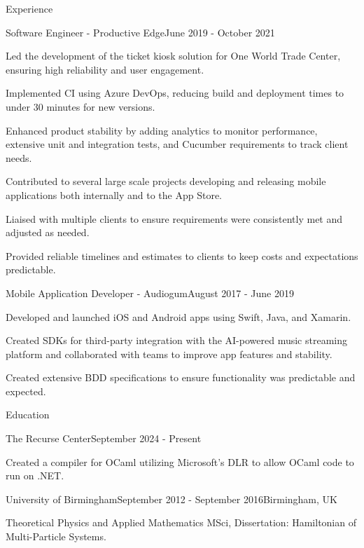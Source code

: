 \documentclass[
	10pt, %
]{resume} %
\begin{document}
\begin{rSection}{Experience}
	\begin{rSubsection}{Software Engineer - Productive Edge}{June 2019 - October 2021}{}{}
		\item Led the development of the ticket kiosk solution for One World Trade Center, ensuring high reliability and user engagement.
		\item Implemented CI using Azure DevOps, reducing build and deployment times to under 30 minutes for new versions.
		\item Enhanced product stability by adding analytics to monitor performance, extensive unit and integration tests, and Cucumber requirements to track client needs.
		\item Contributed to several large scale projects developing and releasing mobile applications both internally and to the App Store.
		\item Liaised with multiple clients to ensure requirements were consistently met and adjusted as needed. 
		\item Provided reliable timelines and estimates to clients to keep costs and expectations predictable.
	\end{rSubsection}


	\begin{rSubsection}{Mobile Application Developer - Audiogum}{August 2017 - June 2019}{}{}	
	\item Developed and launched iOS and Android apps using Swift, Java, and Xamarin.
	\item Created SDKs for third-party integration with the AI-powered music streaming platform and collaborated with teams to improve app features and stability.
	\item Created extensive BDD specifications to ensure functionality was predictable and expected.
\end{rSubsection}
		
	
	\end{rSection}

	

\begin{rSection}{Education}
	
	\begin{rSubsection}{The Recurse Center}{September 2024 - Present}{}{}
		\item Created a compiler for OCaml utilizing Microsoft's DLR to allow OCaml code to run on .NET. 
	\end{rSubsection}

	\begin{rSubsection}{University of Birmingham}{September 2012 - September 2016}{}{Birmingham, UK}
		\item Theoretical Physics and Applied Mathematics MSci, Dissertation: Hamiltonian of Multi-Particle Systems.
	\end{rSubsection}

\end{rSection}
\end{document}
